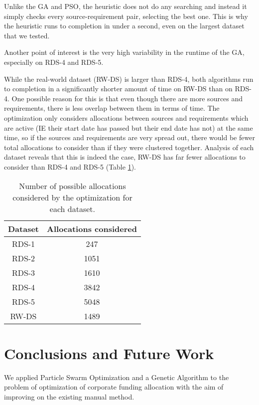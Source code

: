 \documentclass{sig-alternate}
\begin{document}
Unlike the GA and PSO, the heuristic does not do any searching and instead it simply checks every source-requirement pair, selecting the best one. This is why the heuristic runs to completion in under a second, even on the largest dataset that we tested.

Another point of interest is the very high variability in the runtime of the GA, especially on RDS-4 and RDS-5.

While the real-world dataset (RW-DS) is larger than RDS-4, both algorithms run to completion in a significantly shorter amount of time on RW-DS than on RDS-4. One possible reason for this is that even though there are more sources and requirements, there is less overlap between them in terms of time. The optimization only considers allocations between sources and requirements which are active (IE their start date has passed but their end date has not) at the same time, so if the sources and requirements are very spread out, there would be fewer total allocations to consider than if they were clustered together. Analysis of each dataset reveals that this is indeed the case, RW-DS has far fewer allocations to consider than RDS-4 and RDS-5 (Table \ref{table:testdataset_possible_alloc_count}).

\begin{table}
	\centering
	\begin{tabular}{ | c | c  | }
		\hline
		Dataset & Allocations considered \\ \hline
		RDS-1 & 247  \\ \hline
		RDS-2 & 1051  \\ \hline
		RDS-3 & 1610  \\ \hline
		RDS-4 & 3842  \\ \hline
		RDS-5 & 5048 \\ \hline
		RW-DS & 1489 \\ \hline
	\end{tabular}
	\caption{Number of possible allocations considered by the optimization for each dataset.}
	\label{table:testdataset_possible_alloc_count}
\end{table}

\section{Conclusions and Future Work}
We applied Particle Swarm Optimization and a Genetic Algorithm to the problem of optimization of corporate funding allocation with the aim of improving on the existing manual method.
\end{document}
